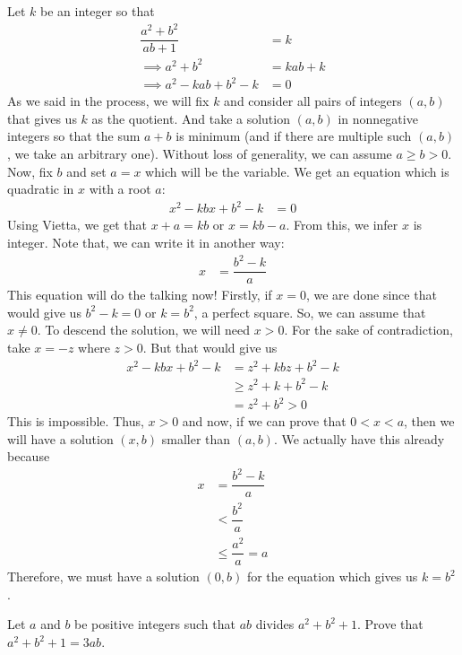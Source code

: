 \documentclass{subfile}
\begin{document}
	\begin{solution}
		Let $k$ be an integer so that
			\begin{align*}
				\dfrac{a^2+b^2}{ab+1}
					& = k \\
				 \implies a^2+b^2
				 	& = kab+k\\
				\implies  a^2-kab+b^2-k
					& = 0
			\end{align*}
		As we said in the process, we will fix $k$ and consider all pairs of integers $(a,b)$ that gives us $k$ as the quotient. And take a solution $(a,b)$ in nonnegative integers so that the sum $a+b$ is minimum (and if there are multiple such $(a,b)$, we take an arbitrary one). Without loss of generality, we can assume $a\geq b>0$. Now, fix $b$ and set $a=x$ which will be the variable. We get an equation which is quadratic in $x$ with a root $a$:
			\begin{align*}
				x^2-kbx+b^2-k & = 0
			\end{align*}
		Using Vietta, we get that $x+a=kb$ or $x=kb-a$. From this, we infer $x$ is integer. Note that, we can write it in another way:
			\begin{align*}
				x & = \dfrac{b^2-k}{a}
			\end{align*}
		This equation will do the talking now! Firstly, if $x=0$, we are done since that would give us $b^2-k=0$ or $k=b^2$, a perfect square. So, we can assume that $x\neq0$. To descend the solution, we will need $x>0$. For the sake of contradiction, take $x=-z$ where $z>0$. But that would give us
			\begin{align*}
				x^2-kbx+b^2-k & = z^2+kbz+b^2-k\\
							  & \geq z^2+k+b^2-k\\
							  & = z^2+b^2> 0
			\end{align*}
		This is impossible. Thus, $x>0$ and now, if we can prove that $0<x<a$, then we will have a solution $(x,b)$ smaller than $(a,b)$. We actually have this already because
			\begin{align*}
				x & = \dfrac{b^2-k}{a}\\
				  & < \dfrac{b^2}{a}\\
				  &\leq\dfrac{a^2}{a} = a
			\end{align*}
		Therefore, we must have a solution $(0,b)$ for the equation which gives us $k=b^2$.
	\end{solution}

	\begin{problem}
		Let $a$ and $b$ be positive integers such that $ab$ divides $a^2 + b^2 + 1$. Prove that $a^2 + b^2 + 1=3ab$.
	\end{problem}
\end{document}
